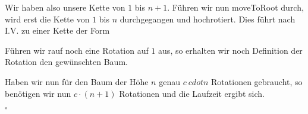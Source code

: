 \documentclass[11pt,a4paper,ngerman]{article}
\begin{document}
Wir haben also unsere Kette von $1$ bis $n+1$. Führen wir nun moveToRoot durch, wird erst die Kette von $1$ bis $n$ durchgegangen und hochrotiert.
Dies führt nach I.V. zu einer Kette der Form 

   \begin{center}
   \end{center}

Führen wir rauf noch eine Rotation auf $1$ aus, so erhalten wir noch Definition der Rotation den gewünschten Baum.

Haben wir nun für den Baum der Höhe $n$ genau $c \ cdot n$ Rotationen gebraucht, so benötigen wir nun $c \cdot (n+1)$ Rotationen und die Laufzeit ergibt sich.

\mbox{}\hfill$\square$
\end{document}
